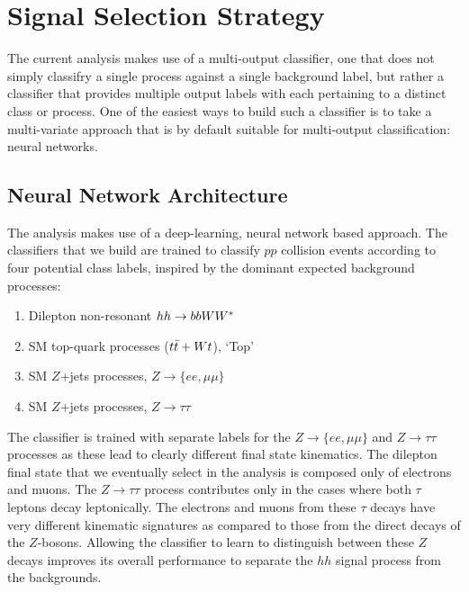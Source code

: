 \section{Signal Selection Strategy}
\label{sec:hh_strategy}

%
%


The current analysis makes use of a multi-output classifier, one that does not simply classifry
a single process against a single background label, but rather a classifier that provides multiple
output labels with each pertaining to a distinct class or process.
One of the easiest ways to build such a classifier is to take a multi-variate approach that
is by default suitable for multi-output classification: neural networks.

\subsection{Neural Network Architecture}
\label{sec:nn_arch}

The analysis makes use of a deep-learning, neural network based approach.
The classifiers that we build are trained to classify $pp$ collision events according to
four potential class labels, inspired by the dominant expected background processes:
\begin{enumerate}
    \item Dilepton non-resonant $hh \rightarrow bbWW^*$
    \item SM top-quark processes ($t\bar{t} + Wt$), `Top'
    \item SM $Z$+jets processes, $Z \rightarrow \{ee,\mu\mu\}$
    \item SM $Z$+jets processes, $Z \rightarrow \tau\tau$
\end{enumerate}
The classifier is trained with separate labels for the $Z \rightarrow \{ee,\mu\mu\}$ and
$Z \rightarrow \tau\tau$ processes as these lead to clearly different final state kinematics.
The dilepton final state that we eventually select in the analysis is composed only of electrons and muons.
The $Z \rightarrow \tau\tau$ process contributes only in the cases where both $\tau$ leptons decay
leptonically.
The electrons and muons from these $\tau$ decays have very different kinematic signatures as compared
to those from the direct decays of the $Z$-bosons.
Allowing the classifier to learn to distinguish between these $Z$ decays improves its overall performance
to separate the $hh$ signal process from the backgrounds.

